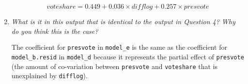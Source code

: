 \documentclass[12pt,letterpaper]{article}
\begin{document}
\begin{enumerate}
		
		\begin{equation*}
		voteshare = 0.449 + 0.036 \times difflog + 0.257 \times presvote
		\end{equation*}
		
	\vspace{.25cm}
		
		\item \emph{What is it in this output that is identical to the output in Question 4? Why do you think this is the case?}	\vspace{.25cm}

		The coefficient for \texttt{presvote} in \texttt{model\_e} is the same as the coefficient for \texttt{model\_b.resid} in \texttt{model\_d} because it represents the partial effect of \texttt{presvote} (the amount of co-variation between \texttt{presvote} and \texttt{voteshare} that is unexplained by \texttt{difflog}).
	\end{enumerate}
	
	
\end{document}
